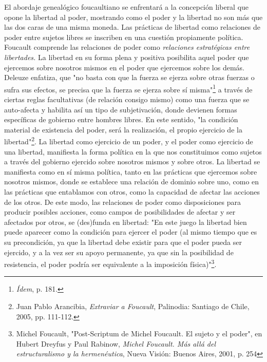 El abordaje genealógico foucaultiano se enfrentará a la concepción
liberal que opone la libertad al poder, mostrando como el poder y la
libertad no son más que las dos caras de una misma moneda. Las prácticas
de libertad como relaciones de poder entre sujetos libres se inscriben
en una cuestión propiamente política. Foucault comprende las relaciones
de poder como \emph{relaciones estratégicas entre libertades.} La
libertad en su forma plena y positiva posibilita aquel poder que
ejercemos sobre nosotros mismos en el poder que ejercemos sobre los
demás. Deleuze enfatiza, que "no basta con que la fuerza se ejerza sobre
otras fuerzas o sufra sus efectos, se precisa que la fuerza se ejerza
sobre sí misma"\footnote{\emph{Ídem}, p. 181.} a través de ciertas
reglas facultativas (de relación consigo mismo) como una fuerza que se
auto-afecta y habilita así un tipo de subjetivación, donde devienen
formas específicas de gobierno entre hombres libres. En este sentido,
"la condición material de existencia del poder, será la realización, el
propio ejercicio de la libertad"\footnote{Juan Pablo Arancibia,
  \emph{Extraviar a Foucault}, Palinodia: Santiago de Chile, 2005, pp.
  111-112.}. La libertad como ejercicio de un poder, y el poder como
ejercicio de una libertad, manifiesta la forma política en la que nos
constituimos como sujetos a través del gobierno ejercido sobre nosotros
mismos y sobre otros. La libertad se manifiesta como en sí misma
política, tanto en las prácticas que ejercemos sobre nosotros mismos,
donde se establece una relación de dominio sobre uno, como en las
prácticas que entablamos con otros, como la capacidad de afectar las
acciones de los otros. De este modo, las relaciones de poder como
disposiciones para producir posibles acciones, como campos de
posibilidades de afectar y ser afectados por otros, se (des)funda en
libertad: "En este juego la libertad bien puede aparecer como la
condición para ejercer el poder (al mismo tiempo que es su precondición,
ya que la libertad debe existir para que el poder pueda ser ejercido, y
a la vez ser su apoyo permanente, ya que sin la posibilidad de
resistencia, el poder podría ser equivalente a la imposición
física)"\footnote{Michel Foucault, "Post-Scriptum de Michel Foucault. El
  sujeto y el poder", en Hubert Dreyfus y Paul Rabinow, \emph{Michel
  Foucault. Más allá del estructuralismo y la hermenéutica}, Nueva
  Visión: Buenos Aires, 2001, p. 254}.

